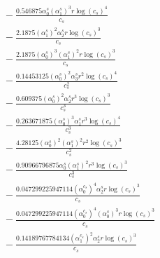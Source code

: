 \documentclass[10pt]{article}
\begin{document}
\begin{align*}
&{}  - \frac{0.546875 \alpha_{0}^s \left(\alpha_{1}^s\right)^{3} r \log{\left(c_{s} \right)}^{4}}{c_{s}} \\
&{}  - \frac{2.1875 \left(\alpha_{1}^s\right)^{2} \alpha_{2}^s r \log{\left(c_{s} \right)}^{3}}{c_{s}} \\
&{}  - \frac{2.1875 \left(\alpha_{0}^s\right)^{3} \left(\alpha_{1}^s\right)^{2} r \log{\left(c_{s} \right)}^{3}}{c_{s}} \\
&{}  - \frac{0.14453125 \left(\alpha_{0}^s\right)^{2} \alpha_{3}^s r^{2} \log{\left(c_{s} \right)}^{4}}{c_{s}^{2}} \\
&{}  - \frac{0.609375 \left(\alpha_{0}^s\right)^{2} \alpha_{2}^s r^{3} \log{\left(c_{s} \right)}^{3}}{c_{s}^{3}} \\
&{}  - \frac{0.263671875 \left(\alpha_{0}^s\right)^{3} \alpha_{1}^s r^{3} \log{\left(c_{s} \right)}^{4}}{c_{s}^{3}} \\
&{}  - \frac{4.28125 \left(\alpha_{0}^s\right)^{2} \left(\alpha_{1}^s\right)^{2} r^{2} \log{\left(c_{s} \right)}^{3}}{c_{s}^{2}} \\
&{}  - \frac{0.90966796875 \alpha_{0}^s \left(\alpha_{1}^s\right)^{2} r^{3} \log{\left(c_{s} \right)}^{3}}{c_{s}^{3}} \\
&{}  - \frac{0.047299225947114 \left(\alpha_{0}^{c_s}\right)^{4} \alpha_{2}^s r \log{\left(c_{s} \right)}^{3}}{c_{s}} \\
&{}  - \frac{0.047299225947114 \left(\alpha_{0}^{c_s}\right)^{4} \left(\alpha_{0}^s\right)^{3} r \log{\left(c_{s} \right)}^{3}}{c_{s}} \\
&{}  - \frac{0.14189767784134 \left(\alpha_{1}^{c_s}\right)^{2} \alpha_{2}^s r \log{\left(c_{s} \right)}^{3}}{c_{s}}
\end{align*}
\end{document}
